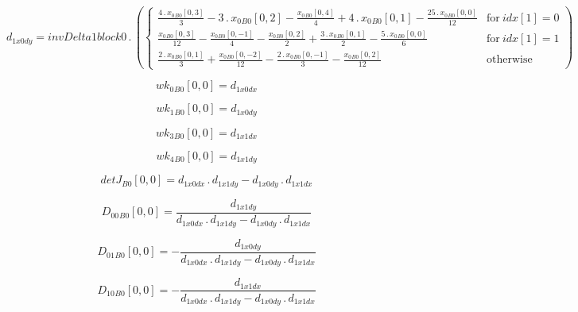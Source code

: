 \documentclass{article}
\begin{document}
\begin{dmath}d_{1 x0 dy} = invDelta1block0 \,.\, \left(\begin{cases} \frac{4 \,.\, {x_{0}{_{B0}}}[{0,3}]}{3} - 3 \,.\, {x_{0}{_{B0}}}[{0,2}] - \frac{{x_{0}{_{B0}}}[{0,4}]}{4} + 4 \,.\, {x_{0}{_{B0}}}[{0,1}] - \frac{25 \,.\, {x_{0}{_{B0}}}[{0,0}]}{12} 
& \text{for}\: {idx}[{1}] = 0 \\\frac{{x_{0}{_{B0}}}[{0,3}]}{12} - \frac{{x_{0}{_{B0}}}[{0,-1}]}{4} - \frac{{x_{0}{_{B0}}}[{0,2}]}{2} + \frac{3 \,.\, {x_{0}{_{B0}}}[{0,1}]}{2} - \frac{5 \,.\, {x_{0}{_{B0}}}[{0,0}]}{6} & \text{for}\: {idx}[{1}] = 1 
\\\frac{2 \,.\, {x_{0}{_{B0}}}[{0,1}]}{3} + \frac{{x_{0}{_{B0}}}[{0,-2}]}{12} - \frac{2 \,.\, {x_{0}{_{B0}}}[{0,-1}]}{3} - \frac{{x_{0}{_{B0}}}[{0,2}]}{12} & \text{otherwise} \end{cases}\right)\end{dmath}

\begin{dmath}{wk_{0}{_{B0}}}[{0,0}] = d_{1 x0 dx}\end{dmath}

\begin{dmath}{wk_{1}{_{B0}}}[{0,0}] = d_{1 x0 dy}\end{dmath}

\begin{dmath}{wk_{3}{_{B0}}}[{0,0}] = d_{1 x1 dx}\end{dmath}

\begin{dmath}{wk_{4}{_{B0}}}[{0,0}] = d_{1 x1 dy}\end{dmath}

\begin{dmath}{detJ{_{B0}}}[{0,0}] = d_{1 x0 dx} \,.\, d_{1 x1 dy} - d_{1 x0 dy} \,.\, d_{1 x1 dx}\end{dmath}

\begin{dmath}{D_{00}{_{B0}}}[{0,0}] = \frac{d_{1 x1 dy}}{d_{1 x0 dx} \,.\, d_{1 x1 dy} - d_{1 x0 dy} \,.\, d_{1 x1 dx}}\end{dmath}

\begin{dmath}{D_{01}{_{B0}}}[{0,0}] = - \frac{d_{1 x0 dy}}{d_{1 x0 dx} \,.\, d_{1 x1 dy} - d_{1 x0 dy} \,.\, d_{1 x1 dx}}\end{dmath}

\begin{dmath}{D_{10}{_{B0}}}[{0,0}] = - \frac{d_{1 x1 dx}}{d_{1 x0 dx} \,.\, d_{1 x1 dy} - d_{1 x0 dy} \,.\, d_{1 x1 dx}}\end{dmath}
\end{document}
